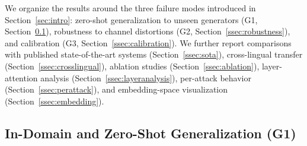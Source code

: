 
We organize the results around the three failure modes introduced in
Section~\ref{sec:intro}: zero-shot generalization to unseen generators (G1,
Section~\ref{ssec:generalization}), robustness to channel distortions (G2,
Section~\ref{ssec:robustness}), and calibration (G3,
Section~\ref{ssec:calibration}). We further report comparisons with published
state-of-the-art systems (Section~\ref{ssec:sota}), cross-lingual transfer
(Section~\ref{ssec:crosslingual}), ablation studies (Section~\ref{ssec:ablation}),
layer-attention analysis (Section~\ref{ssec:layeranalysis}), per-attack behavior
(Section~\ref{ssec:perattack}), and embedding-space visualization
(Section~\ref{ssec:embedding}).

\subsection{In-Domain and Zero-Shot Generalization (G1)}
\label{ssec:generalization}


